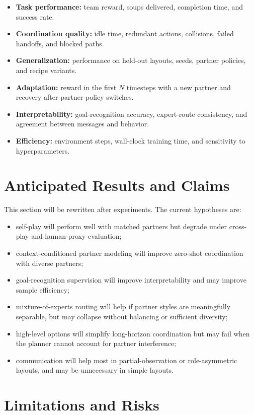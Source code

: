 \documentclass[letterpaper]{article} %
\begin{document}
\begin{itemize}
    \item \textbf{Task performance:} team reward, soups delivered, completion time, and success rate.
    \item \textbf{Coordination quality:} idle time, redundant actions, collisions, failed handoffs, and blocked paths.
    \item \textbf{Generalization:} performance on held-out layouts, seeds, partner policies, and recipe variants.
    \item \textbf{Adaptation:} reward in the first $N$ timesteps with a new partner and recovery after partner-policy switches.
    \item \textbf{Interpretability:} goal-recognition accuracy, expert-route consistency, and agreement between messages and behavior.
    \item \textbf{Efficiency:} environment steps, wall-clock training time, and sensitivity to hyperparameters.
\end{itemize}

\section{Anticipated Results and Claims}

This section will be rewritten after experiments. The current hypotheses are:
\begin{itemize}
    \item self-play will perform well with matched partners but degrade under cross-play and human-proxy evaluation;
    \item context-conditioned partner modeling will improve zero-shot coordination with diverse partners;
    \item goal-recognition supervision will improve interpretability and may improve sample efficiency;
    \item mixture-of-experts routing will help if partner styles are meaningfully separable, but may collapse without balancing or sufficient diversity;
    \item high-level options will simplify long-horizon coordination but may fail when the planner cannot account for partner interference;
    \item communication will help most in partial-observation or role-asymmetric layouts, and may be unnecessary in simple layouts.
\end{itemize}

\section{Limitations and Risks}
\end{document}
